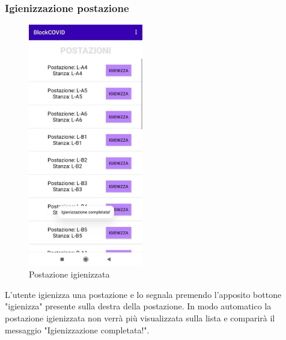 	\subsubsection{Igienizzazione postazione}
	\begin{figure}[H]
		\centering
		\includegraphics[width=5cm]{res/images/igienizzazionePostazioniAddetto.png}
		\caption{Postazione igienizzata}
	\end{figure}
	L'utente igienizza una postazione e lo segnala premendo l'apposito bottone "igienizza" presente sulla destra della postazione. In modo automatico la postazione igienizzata non verrà più visualizzata sulla lista e comparirà il messaggio "Igienizzazione completata!".
	
